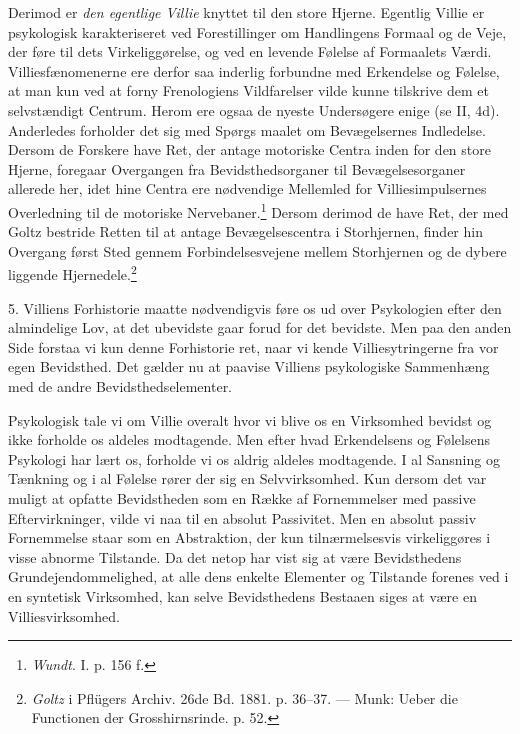 \documentclass[12pt,a4paper,openany]{book}
\newcommand{\opage}[1]{\marginnote{\footnotesize\textit{[#1]}}}
\begin{document}
Derimod er \emph{den egentlige Villie} knyttet til den store Hjerne.
Egentlig Villie er psykologisk karakteriseret ved Forestillinger om
Handlingens Formaal og de Veje, der føre til dets Virkeliggørelse, og
ved en levende Følelse af Formaalets Værdi. Villiesfænomenerne ere
derfor saa inderlig forbundne med Erkendelse og Følelse, at man kun ved
at forny Frenologiens Vildfarelser vilde kunne tilskrive dem et
selvstændigt Centrum. Herom ere ogsaa de nyeste Undersøgere enige (se
II, 4d). Anderledes forholder det sig med Spørgs%
\opage{371}maalet om Bevægelsernes Indledelse. Dersom de Forskere have
Ret, der antage motoriske Centra inden for den store Hjerne, foregaar
Overgangen fra Bevidsthedsorganer til Bevægelsesorganer allerede her,
idet hine Centra ere nødvendige Mellemled for Villiesimpulsernes
Overledning til de motoriske Nervebaner.\footnote[1]{\emph{Wundt}. I. p.
156 f.} Dersom derimod de have Ret, der med Goltz bestride Retten til at
antage Bevægelsescentra i Storhjernen, finder hin Overgang først Sted
gennem Forbindelsesvejene mellem Storhjernen og de dybere liggende
Hjernedele.\footnote[2]{\emph{Goltz} i Pflügers Archiv. 26de Bd. 1881.
p. 36--37. --- Munk: Ueber die Functionen der Grosshirnsrinde. p. 52.}

5. Villiens Forhistorie maatte nødvendigvis føre os ud over Psykologien
efter den almindelige Lov, at det ubevidste gaar forud for det bevidste.
Men paa den anden Side forstaa vi kun denne Forhistorie ret, naar vi
kende Villiesytringerne fra vor egen Bevidsthed. Det gælder nu at
paavise Villiens psykologiske Sammenhæng med de andre
Bevidsthedselementer.

Psykologisk tale vi om Villie overalt hvor vi blive os en Virksomhed
bevidst og ikke forholde os aldeles modtagende. Men efter hvad
Erkendelsens og Følelsens Psykologi har lært os, forholde vi os aldrig
aldeles modtagende. I al Sansning og Tænkning og i al Følelse rører der
sig en Selvvirksomhed. Kun dersom det var muligt at opfatte Bevidstheden
som en Række af Fornemmelser med passive Eftervirkninger, vilde vi naa
til en absolut Passivitet. Men en absolut passiv Fornemmelse staar som
en Abstraktion, der kun tilnærmelsesvis virkeliggøres i visse abnorme
Tilstande. Da det netop har vist sig at være Bevidsthedens
Grundejendommelighed, at alle dens enkelte Elementer og Tilstande
forenes ved i en syntetisk Virksomhed, kan selve Bevidsthedens Bestaaen
siges at være en Villiesvirksomhed.
\end{document}
